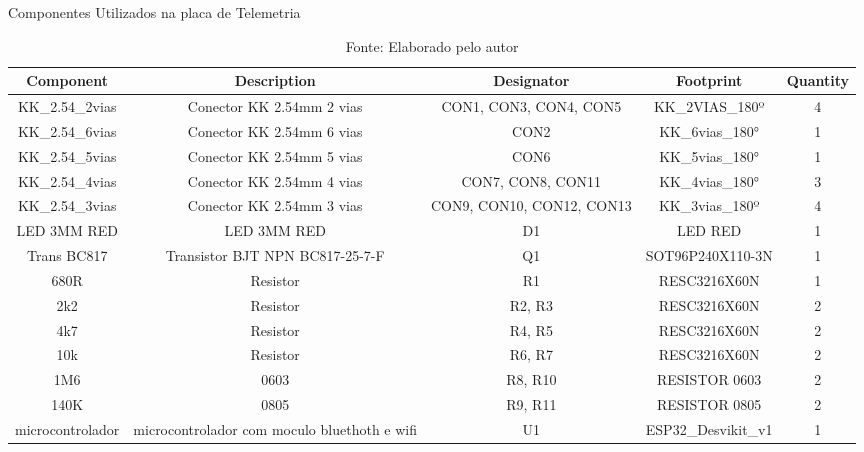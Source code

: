 \documentclass[../delivery_hospital_report.tex]{subfiles}
\begin{document}
\begin{table}[]
\caption{Componentes Utilizados na placa de Telemetria}
\centering
\begin{adjustbox}{width=\columnwidth,center}
\begin{tabular}{|c|c|c|c|c|}

\hline
Component        & Description                                    & Designator                  & Footprint           & Quantity \\ \hline
KK\_2.54\_2vias  & Conector KK 2.54mm 2   vias                    & CON1, CON3, CON4,   CON5    & KK\_2VIAS\_180º     & 4        \\ \hline
KK\_2.54\_6vias  & Conector KK 2.54mm 6   vias                    & CON2                        & KK\_6vias\_180°     & 1        \\ \hline
KK\_2.54\_5vias  & Conector KK 2.54mm 5   vias                    & CON6                        & KK\_5vias\_180°     & 1        \\ \hline
KK\_2.54\_4vias  & Conector KK 2.54mm 4   vias                    & CON7, CON8, CON11           & KK\_4vias\_180°     & 3        \\ \hline
KK\_2.54\_3vias  & Conector KK 2.54mm 3   vias                    & CON9, CON10, CON12,   CON13 & KK\_3vias\_180º     & 4        \\ \hline
LED 3MM RED      & LED 3MM RED                                    & D1                          & LED RED             & 1        \\ \hline
Trans BC817      & Transistor BJT NPN   BC817-25-7-F              & Q1                          & SOT96P240X110-3N    & 1        \\ \hline
680R             & Resistor                                       & R1                          & RESC3216X60N        & 1        \\ \hline
2k2              & Resistor                                       & R2, R3                      & RESC3216X60N        & 2        \\ \hline
4k7              & Resistor                                       & R4, R5                      & RESC3216X60N        & 2        \\ \hline
10k              & Resistor                                       & R6, R7                      & RESC3216X60N        & 2        \\ \hline
1M6              & 0603                                           & R8, R10                     & RESISTOR 0603       & 2        \\ \hline
140K             & 0805                                           & R9, R11                     & RESISTOR 0805       & 2        \\ \hline
microcontrolador & microcontrolador com   moculo bluethoth e wifi & U1                          & ESP32\_Desvikit\_v1 & 1        \\ \hline

\end{tabular}
\end{adjustbox}
\centering
\caption*{Fonte: Elaborado pelo autor}
\label{table:voc}
\end{table}
\end{document}
